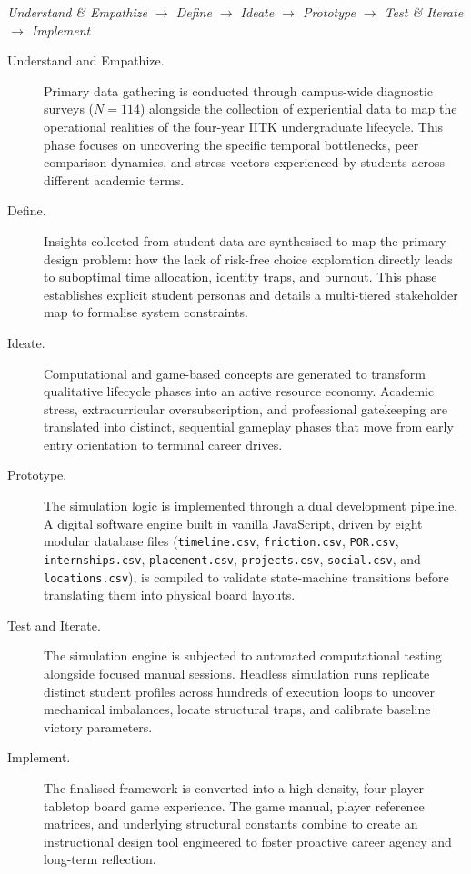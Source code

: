 \begin{center}
\itshape Understand \& Empathize $\rightarrow$ Define $\rightarrow$ Ideate $\rightarrow$ Prototype $\rightarrow$ Test \& Iterate $\rightarrow$ Implement
\end{center}

\begin{description}
  \item[Understand and Empathize.] Primary data gathering is conducted through campus-wide diagnostic surveys ($N = 114$) alongside the collection of experiential data to map the operational realities of the four-year IITK undergraduate lifecycle. This phase focuses on uncovering the specific temporal bottlenecks, peer comparison dynamics, and stress vectors experienced by students across different academic terms.

  \item[Define.] Insights collected from student data are synthesised to map the primary design problem: how the lack of risk-free choice exploration directly leads to suboptimal time allocation, identity traps, and burnout. This phase establishes explicit student personas and details a multi-tiered stakeholder map to formalise system constraints.

  \item[Ideate.] Computational and game-based concepts are generated to transform qualitative lifecycle phases into an active resource economy. Academic stress, extracurricular oversubscription, and professional gatekeeping are translated into distinct, sequential gameplay phases that move from early entry orientation to terminal career drives.

  \item[Prototype.] The simulation logic is implemented through a dual development pipeline. A digital software engine built in vanilla JavaScript, driven by eight modular database files (\texttt{timeline.csv}, \texttt{friction.csv}, \texttt{POR.csv}, \texttt{internships.csv}, \texttt{placement.csv}, \texttt{projects.csv}, \texttt{social.csv}, and \texttt{locations.csv}), is compiled to validate state-machine transitions before translating them into physical board layouts.

  \item[Test and Iterate.] The simulation engine is subjected to automated computational testing alongside focused manual sessions. Headless simulation runs replicate distinct student profiles across hundreds of execution loops to uncover mechanical imbalances, locate structural traps, and calibrate baseline victory parameters.

  \item[Implement.] The finalised framework is converted into a high-density, four-player tabletop board game experience. The game manual, player reference matrices, and underlying structural constants combine to create an instructional design tool engineered to foster proactive career agency and long-term reflection.
\end{description}

